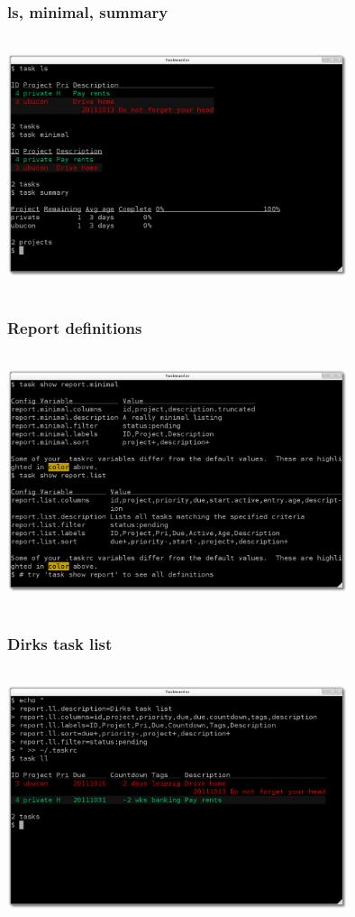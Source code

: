 \documentclass[t,handout]{beamer}
\begin{document}
\begin{frame}
\frametitle{ls, minimal, summary}
\begin{center}
\includegraphics[width=10cm,height=7.5cm]{reports03.png}
\end{center}
\end{frame}

\begin{frame}
\frametitle{Report definitions}
\begin{center}
\includegraphics[width=10cm,height=7.5cm]{report_definitions.png}
\end{center}
\end{frame}

\begin{frame}
\frametitle{Dirks task list}
\begin{center}
\includegraphics[width=10cm,height=7.5cm]{report_dirks_list.png}
\end{center}
\end{frame}
\end{document}
